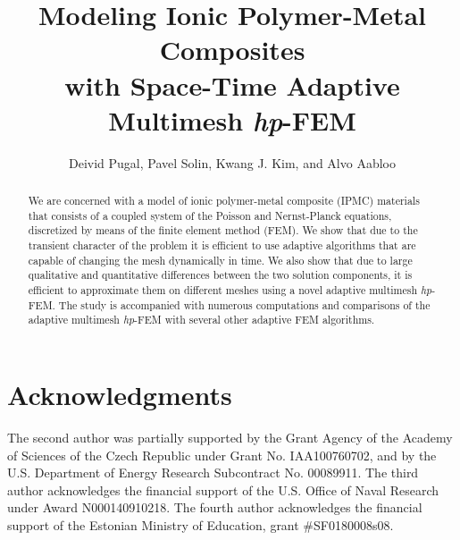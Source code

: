 \documentclass[mathpazo]{cicp}
\begin{document}
\title{Modeling Ionic Polymer-Metal Composites\\ with Space-Time Adaptive Multimesh \emph{hp}-FEM}


\author[Deivid Pugal et.~al.]{Deivid Pugal\comma{},
Pavel Solin\comma{}\comma\corrauth,
Kwang J. Kim, and Alvo Aabloo}

\address{\ Mechanical Engineering Department, University of Nevada, Reno, NV, U.S.A.\\
\ Department of Mathematics and Statistics, University of Nevada, Reno, NV, U.S.A.\\
\ Institute of Thermomechanics, Prague, Czech Republic\\
\ Institute of Technology, Tartu University, Estonia}


\begin{abstract}
We are concerned with a model of ionic polymer-metal composite (IPMC) materials
that consists of a coupled system of the Poisson and Nernst-Planck equations, 
discretized by means of the finite element method (FEM). We show that due to the 
transient character of the problem it is efficient to use adaptive algorithms 
that are capable of changing the mesh dynamically in time. We also show 
that due to large qualitative and quantitative differences between the 
two solution components, it is efficient to approximate them on different 
meshes using a novel adaptive multimesh \emph{hp}-FEM. The study is 
accompanied with numerous computations and comparisons of the adaptive 
multimesh \emph{hp}-FEM with several other adaptive FEM algorithms. 
\end{abstract}

\maketitle








\section*{Acknowledgments}
The second author was partially supported by the Grant Agency of the Academy of 
Sciences of the Czech Republic under Grant No. IAA100760702, and by the U.S.
Department of Energy Research Subcontract No. 00089911. 
The third author acknowledges the financial support of the U.S. Office of Naval Research 
under Award N000140910218. The fourth author acknowledges the financial support of
the Estonian Ministry of Education, grant \#SF0180008s08.
\end{document}
